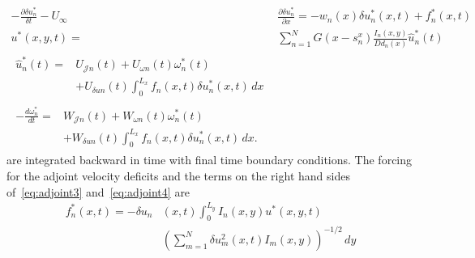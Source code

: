 \begin{align}
\label{eq:adjoint1}
-\frac{\partial \delta u^*_n}{\delta t} - U_\infty& \frac{\partial \delta u^*_n}{\partial x} =- w_n(x) \delta u^*_n(x,t) + f_n^*(x,t) \\
%
\label{eq:adjoint2}
u^*(x,y,t) =& \sum_{n=1}^N G(x-s_n^x) \frac{I_n(x,y)}{D d_n(x)} \hat{u}_n^*(t)\\
%
\label{eq:adjoint3}
\begin{split}
\hat{u}_n^*(t) =& U_{\mathcal{J}n}(t) + U_{\omega n}(t) \omega_n^*(t) \\
&+ U_{\delta u n}(t) \int_0^{L_x} f_n(x, t) \delta u_n^*(x,t) \, dx
\end{split}\\
%
\label{eq:adjoint4}
\begin{split}
- \frac{d \omega_n^*}{dt} =& W_{\mathcal{J}n}(t) + W_{\omega n}(t) \omega_n^*(t) \\
&+ W_{\delta u n}(t) \int_0^{L_x} f_n(x,t) \delta u_n^*(x,t) \, dx.
\end{split}
 \end{align}
are integrated backward in time with final time boundary conditions. The forcing for the adjoint velocity deficits and the terms on the right hand sides of~\eqref{eq:adjoint3} and~\eqref{eq:adjoint4} are
\begin{equation*}
\begin{split}
f_n^*(x,t) = - \delta u_n&(x,t) \int_0^{L_y} I_n(x,y) u^*(x,y,t)\\
&\left(\sum_{m=1}^N \delta u_m^2(x,t) I_m(x,y)\right)^{-1/2} \, dy 
\end{split}
\end{equation*}
\vspace{-1.4em}
